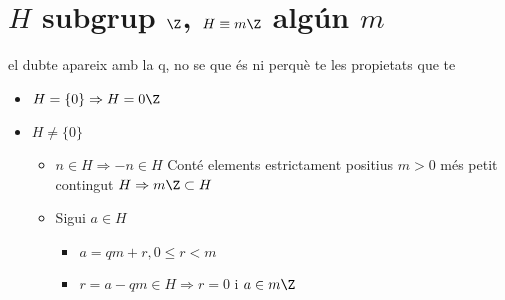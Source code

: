 \documentclass{article}
\begin{document}
\section{$H$ subgrup $\Z$, $H \equiv m\Z$ algún $m$}
el dubte apareix amb la q, no se que és ni perquè te les propietats que te
\begin{itemize}
\item $H = \{0\} \Rightarrow H = 0 \Z$
\item $H \neq \{0\}$
	\begin{itemize}
	\item $n \in H \Rightarrow -n \in H$
		\subitem Conté elements estrictament positius
		\subitem $m > 0$ més petit contingut $H \Rightarrow m\Z \subset H$
	\item Sigui $a \in H$
		\begin{itemize}
		\item $a = qm + r, 0 \le r < m$
		\item $r = a - qm \in H \Rightarrow r = 0$ i $a \in m\Z$
		\end{itemize}
	\end{itemize}
\end{itemize}
\end{document}
